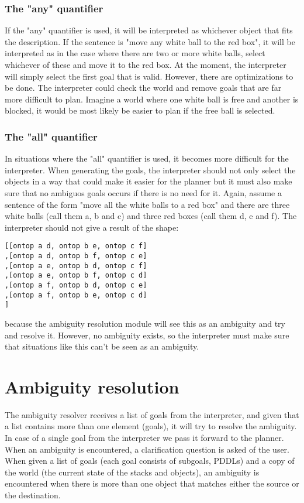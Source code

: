 \documentclass[11pt]{article}
\begin{document}
\subsubsection{The "any" quantifier}
If the "any" quantifier is used, it will be interpreted as whichever object that fits the description. If the sentence is "move any white ball to the red box", it will be interpreted as in the case where there are two or more white balls, select whichever of these and move it to the red box. At the moment, the interpreter will simply select the first goal that is valid. However, there are optimizations to be done. The interpreter could check the world and remove goals that are far more difficult to plan. Imagine a world where one white ball is free and another is blocked, it would be most likely be easier to plan if the free ball is selected.

\subsubsection{The "all" quantifier}
In situations where the "all" quantifier is used, it becomes more difficult for the interpreter. When generating the goals, the interpreter should not only select the objects in a way that could make it easier for the planner but it must also make sure that no ambiguos goals occurs if there is no need for it. Again, assume a sentence of the form "move all the white balls to a red box" and there are three white balls (call them a, b and c) and three red boxes (call them d, e and f). The interpreter should not give a result of the shape:
\begin{verbatim}
[[ontop a d, ontop b e, ontop c f]
,[ontop a d, ontop b f, ontop c e]
,[ontop a e, ontop b d, ontop c f]
,[ontop a e, ontop b f, ontop c d]
,[ontop a f, ontop b d, ontop c e]
,[ontop a f, ontop b e, ontop c d]
]
\end{verbatim}
because the ambiguity resolution module will see this as an ambiguity and try and resolve it. However, no ambiguity exists, so the interpreter must make sure that situations like this can't be seen as an ambiguity.

\section{Ambiguity resolution}
The ambiguity resolver receives a list of goals from the interpreter, and given that a list contains more than one element (goals), it will try to resolve the ambiguity. In case of a single goal from the interpreter we pass it forward to the planner. When an ambiguity is encountered, a clarification question is asked of the user.
When given a list of goals (each goal consists of subgoals, PDDLs) and a copy of the world (the current state of the stacks and objects), an ambiguity is encountered when there is more than one object that matches either the source or the destination.
\end{document}
